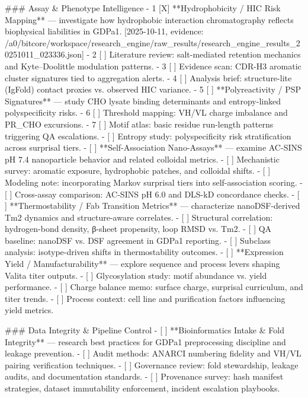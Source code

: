 ### Assay & Phenotype Intelligence
- 1 [X] **Hydrophobicity / HIC Risk Mapping** — investigate how hydrophobic interaction chromatography reflects biophysical liabilities in GDPa1. [2025-10-11, evidence: /a0/bitcore/workspace/research_engine/raw_results/research_engine_results_20251011_023336.json]
  - 2 [ ] Literature review: salt-mediated retention mechanics and Kyte–Doolittle modulation patterns.
  - 3 [ ] Evidence scan: CDR-H3 aromatic cluster signatures tied to aggregation alerts.
  - 4 [ ] Analysis brief: structure-lite (IgFold) contact proxies vs. observed HIC variance.
- 5 [ ] **Polyreactivity / PSP Signatures** — study CHO lysate binding determinants and entropy-linked polyspecificity risks.
  - 6 [ ] Threshold mapping: VH/VL charge imbalance and PR_CHO excursions.
  - 7 [ ] Motif atlas: basic residue run-length patterns triggering QA escalations.
    - [ ] Entropy study: polyspecificity risk stratification across surprisal tiers.
- [ ] **Self-Association Nano-Assays** — examine AC-SINS pH 7.4 nanoparticle behavior and related colloidal metrics.
  - [ ] Mechanistic survey: aromatic exposure, hydrophobic patches, and colloidal shifts.
  - [ ] Modeling note: incorporating Markov surprisal tiers into self-association scoring.
  - [ ] Cross-assay comparison: AC-SINS pH 6.0 and DLS-kD concordance checks.
- [ ] **Thermostability / Fab Transition Metrics** — characterize nanoDSF-derived Tm2 dynamics and structure-aware correlates.
  - [ ] Structural correlation: hydrogen-bond density, β-sheet propensity, loop RMSD vs. Tm2.
  - [ ] QA baseline: nanoDSF vs. DSF agreement in GDPa1 reporting.
  - [ ] Subclass analysis: isotype-driven shifts in thermostability outcomes.
- [ ] **Expression Yield / Manufacturability** — explore sequence and process levers shaping Valita titer outputs.
  - [ ] Glycosylation study: motif abundance vs. yield performance.
  - [ ] Charge balance memo: surface charge, surprisal curriculum, and titer trends.
  - [ ] Process context: cell line and purification factors influencing yield metrics.

### Data Integrity & Pipeline Control
- [ ] **Bioinformatics Intake & Fold Integrity** — research best practices for GDPa1 preprocessing discipline and leakage prevention.
  - [ ] Audit methods: ANARCI numbering fidelity and VH/VL pairing verification techniques.
  - [ ] Governance review: fold stewardship, leakage audits, and documentation standards.
  - [ ] Provenance survey: hash manifest strategies, dataset immutability enforcement, incident escalation playbooks.

